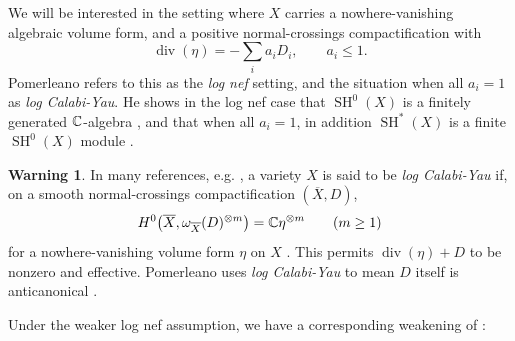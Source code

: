 \documentclass[12pt, letter]{amsart}
\theoremstyle{definition}
\newtheorem{warning}[theorem]{Warning}
\newcommand{\SH}{\operatorname{SH}}
\numberwithin{equation}{section}
\begin{document}
We will be interested in the setting where $X$ carries a nowhere-vanishing algebraic volume form, and a positive normal-crossings compactification with
\[
 \operatorname{div}(\eta)=-\sum_i a_iD_i,\qquad a_i\le1.
\]
Pomerleano refers to this as the {\em log nef} setting, and the situation when all $a_i=1$ as {\em log Calabi-Yau}.  He shows 
in the log nef case that $\SH^0(X)$ is a finitely generated $\mathbb C$-algebra \cite[Corollary~4.22]{Pom}, and 
that when all $a_i = 1$, in addition
$\SH^*(X)$ is a finite $\SH^0(X)$ module
\cite[Theorem~1.1(a),(b), Lemma~4.24]{Pom}.

\begin{warning}
    In many references, e.g. \cite{GHK}, a variety $X$ is said to be {\em log Calabi-Yau} if, on a smooth
normal-crossings compactification $(\overline X,D)$,
\[
 H^0\bigl(\overline X,\omega_{\overline X}(D)^{\otimes m}\bigr)
       =\mathbb C\eta^{\otimes m}\qquad(m\ge1)
\]
for a nowhere-vanishing volume form $\eta$ on $X$
\cite[Definition~1.1]{GHK}.
This permits $\operatorname{div}(\eta)+D$ to be nonzero and effective.
Pomerleano uses {\em log Calabi-Yau} to mean $D$ itself is
anticanonical
\cite[Section~1 and Definition~3.1]{Pom}.
\end{warning}

Under the weaker log nef assumption, we have a corresponding weakening of \cite[Lemma 4.24]{Pom}: 
\end{document}
